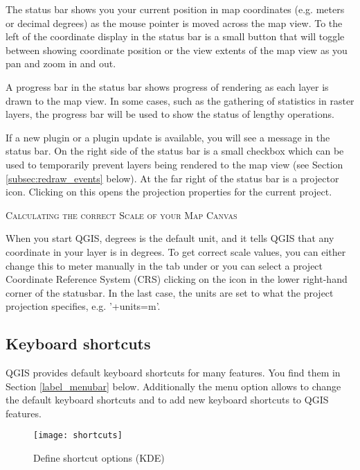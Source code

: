 The status bar shows you your current position in map coordinates (e.g.
meters or decimal degrees) as the mouse pointer is moved across the map view.
To the left of the coordinate display in the status bar is a small button that
will toggle between showing coordinate position or the view extents of the
map view as you pan and zoom in and out.

A progress bar in the status bar shows progress of rendering
as each layer is drawn to the map view. In some cases, such as the gathering
of statistics in raster layers, the progress bar will be used to show the
status of lengthy operations.

If a new plugin or a plugin update is available, you will see a message in the
status bar. On the right side of the status bar is a small
checkbox which can be used to temporarily prevent layers being rendered to the
map view (see Section \ref{subsec:redraw_events} below). At the far right of
the status bar is a projector icon. Clicking on this opens the projection
properties for the current project.

\begin{Tip}\caption{\textsc{Calculating the correct Scale of your Map Canvas}}
When you start QGIS, degrees is the default unit, and it tells QGIS
that any coordinate in your layer is in degrees. To get correct scale values,
you can either change this to meter manually in the  tab under
 \arrow {} or you can select a project
Coordinate Reference System (CRS) clicking on the
icon in the lower right-hand corner of the statusbar. In the last case, the
units are set to what the project projection specifies, e.g. '+units=m'.
\end{Tip}

\subsection{Keyboard shortcuts}\label{shortcuts}

QGIS provides default keyboard shortcuts for many features. You find them in
Section \ref{label_menubar} below. Additionally the menu option  \arrow
{} allows to change the default keyboard
shortcuts and to add new keyboard shortcuts to QGIS features.

\begin{figure}[ht]
   \centering
   \texttt{[image: shortcuts]}
   \caption{Define shortcut options \nixcaption (KDE)} \label{fig:shortcuts}
\end{figure}

